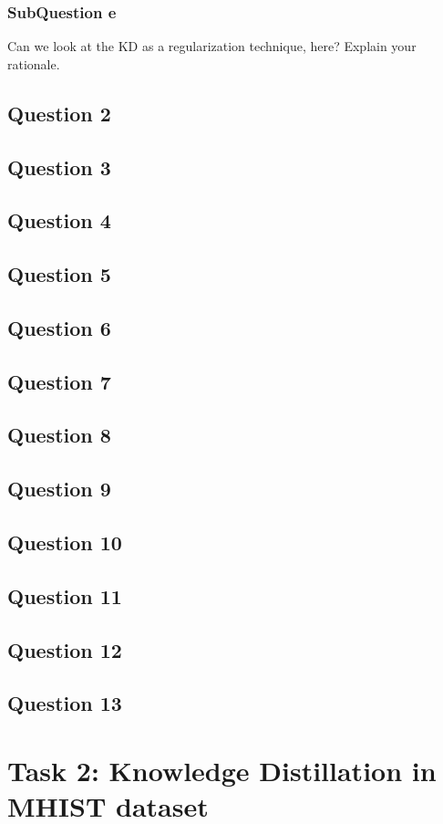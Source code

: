\documentclass[conference]{IEEEtran}
\begin{document}
\subsubsection{SubQuestion e}
Can we look at the KD as a regularization technique, here? Explain your rationale.
\subsection{Question 2}
\subsection{Question 3}
\subsection{Question 4}
\subsection{Question 5}
\subsection{Question 6}
\subsection{Question 7}
\subsection{Question 8}
\subsection{Question 9}
\subsection{Question 10}
\subsection{Question 11}
\subsection{Question 12}
\subsection{Question 13}
\section{Task 2: Knowledge Distillation in MHIST dataset}
\end{document}
